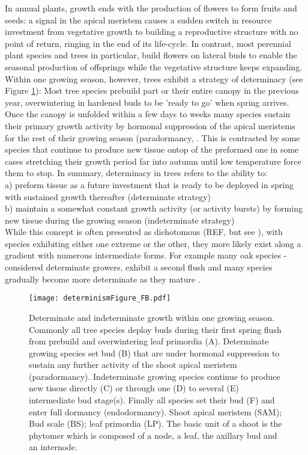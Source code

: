 \documentclass{article}
\begin{document}
In annual plants, growth ends with the production of flowers to form fruits and seeds: a signal in the apical meristem causes a sudden switch in resource investment from vegetative growth to building a reproductive structure with no point of return, ringing in the end of its life-cycle. In contrast, most perennial plant species and trees in particular, build flowers on lateral buds to enable the seasonal production of offsprings while the vegetative structure keeps expanding. \\

Within one growing season, however, trees exhibit a strategy of determinacy (see Figure \ref{fig:fig_2xxx}): Most tree species prebuild part or their entire canopy in the previous year, overwintering in hardened buds to be 'ready to go' when spring arrives. Once the canopy is unfolded within a few days to weeks many species sustain their primary growth activity by hormonal suppression of the apical meristems for the rest of their growing season (paradormancy, \citep{langEndoParaEcodormancy1987}. This is contrasted by some species that continue to produce new tissue ontop of the preformed one in some cases stretching their growth period far into autumn until low temperature force them to stop. In summary, determinacy in trees refers to the ability to:\\
a) preform tissue as a future investment that is ready to be deployed in spring with sustained growth thereafter (determinate strategy)\\
b) maintain a somewhat constant growth activity (or activity bursts) by forming new tissue during the growing season (indeterminate strategy)\\

While this concept is often presented as dichotomous (REF, but see \citet{kikuzawaLeafSurvivalWoody1983}), with species exhibiting either one extreme or the other, they more likely exist along a gradient with numerous intermediate forms. For example many oak species - considered determinate growers, exhibit a second flush and many species gradually become more determinate as they mature \citep{borchertConceptJuvenilityWoody1976}.
	
	
								\begin{figure}
								\centering
								\texttt{[image: determinismFigure\_FB.pdf]} 
								\caption{Determinate and indeterminate growth within one growing season. Commonly all tree species deploy buds during their first spring flush from prebuild and overwintering leaf primordia (A). Determinate growing species set bud (B) that are under hormonal suppression to sustain any further activity of the shoot apical meristem (paradormancy). Indeterminate growing species continue to produce new tissue directly (C) or through one (D) to several (E) intermediate bud stage(s). Finally all species set their bud (F) and enter full dormancy (endodormancy). Shoot apical meristem (SAM); Bud scale (BS); leaf primordia (LP). The basic unit of a shoot is the phytomer which is composed of a node, a leaf, the axillary bud and an internode.}
								\label{fig:fig_2xxx}
								\end{figure}
	
\end{document}
